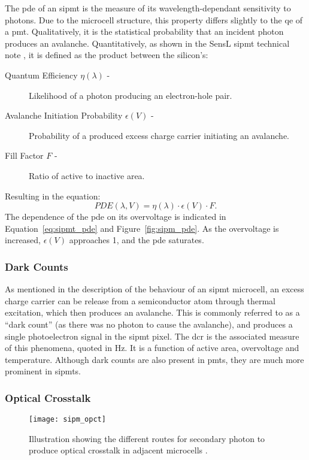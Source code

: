 The \gls{pde} of an \gls{sipmt} is the measure of its wavelength-dependant sensitivity to photons. Due to the microcell structure, this property differs slightly to the \gls{qe} of a \gls{pmt}. Qualitatively, it is the statistical probability that an incident photon produces an avalanche. Quantitatively, as shown in the SensL \gls{sipmt} technical note \cite{SensL2011}, it is defined as the product between the silicon's:
\begin{description}
\item [Quantum Efficiency $\eta(\lambda)$ -] Likelihood of a photon producing an electron-hole pair. 
\item [Avalanche Initiation Probability $\epsilon(V)$ -] Probability of a produced excess charge carrier initiating an avalanche.
\item [Fill Factor $F$ -] Ratio of active to inactive area.
\end{description}
Resulting in the equation:
\begin{equation} \label{eq:sipmt_pde}
PDE(\lambda, V) = \eta(\lambda) \cdot \epsilon(V) \cdot F.
\end{equation}
The dependence of the \gls{pde} on its overvoltage is indicated in Equation~\ref{eq:sipmt_pde} and Figure~\ref{fig:sipm_pde}. As the overvoltage is increased, $\epsilon(V)$ approaches 1, and the \gls{pde} saturates.

\subsubsection{Dark Counts}

As mentioned in the description of the behaviour of an \gls{sipmt} microcell, an excess charge carrier can be release from a semiconductor atom through thermal excitation, which then produces an avalanche. This is commonly referred to as a ``dark count'' (as there was no photon to cause the avalanche), and produces a single photoelectron signal in the \gls{sipmt} pixel. The \gls{dcr} is the associated measure of this phenomena, quoted in \si{Hz}. It is a function of active area, overvoltage and temperature. Although dark counts are also present in \glspl{pmt}, they are much more prominent in \glspl{sipmt}.

\subsubsection{Optical Crosstalk}

\begin{figure}
	\centering
    \texttt{[image: sipm\_opct]} 
	\caption[Illustration of the possible ways optical crosstalk is produced.]{Illustration showing the different routes for secondary photon to produce optical crosstalk in adjacent microcells \cite{Rech2008}.}
	\label{fig:sipm_opct}
\end{figure}

